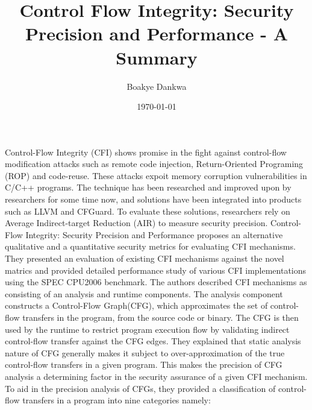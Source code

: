 \documentclass[dvips,12pt]{article}
\begin{document}

\title{Control Flow Integrity: Security Precision and Performance - A Summary}
\author{Boakye Dankwa}
\date{\today}



\maketitle


Control-Flow Integrity (CFI) shows promise in the fight against control-flow modification attacks such as remote code injection, Return-Oriented Programing (ROP) and code-reuse. These attacks expoit memory corruption vulnerabilities in C/C++ programs. The technique has been researched and improved upon by researchers for some time now, and solutions have been integrated into products such as LLVM and CFGuard. To evaluate these solutions, researchers rely on Average Indirect-target Reduction (AIR) to measure security precision. Control-Flow Integrity: Security Precision and Performance \cite{DBLP:journals/corr/BurowCBPNLF16} proposes an alternative qualitative and a quantitative security metrics for evaluating CFI mechanisms. They presented an evaluation of existing CFI mechanisms against the novel matrics and provided detailed performance study of various CFI implementations using the SPEC CPU2006 benchmark.
\newline
\newline
The authors described CFI mechanisms as consisting of an analysis and runtime components. The analysis component constructs a Control-Flow Graph(CFG), which approximates the set of control-flow transfers in the program, from the source code or binary. The CFG is then used by the runtime to restrict program execution flow by validating indirect control-flow transfer against the CFG edges. They explained that static analysis nature of CFG generally makes it subject to over-approximation of the true control-flow transfers in a given program. This makes the precision of CFG analysis a determining factor in the security assurance of a given CFI mechanism. To aid in the precision analysis of CFGs, they provided a classification of control-flow transfers in a program into nine categories namely:
\end{document}
